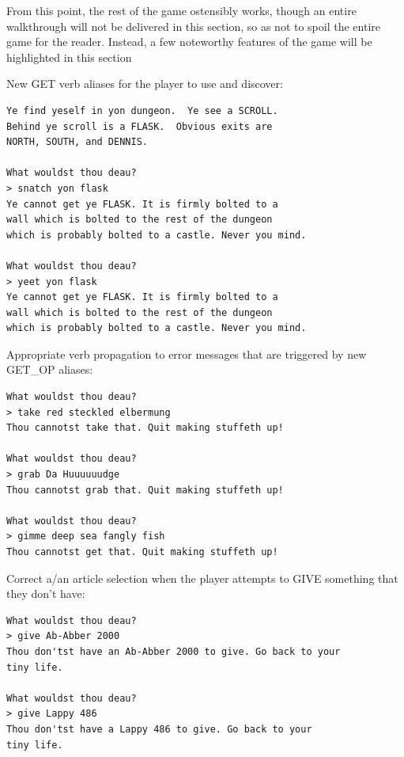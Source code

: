 \documentclass[man,12pt]{apa6}
\begin{document}
From this point, the rest of the game ostensibly works, though an entire
walkthrough will not be delivered in this section, so as not to spoil the entire
game for the reader.  Instead, a few noteworthy features of the game will be
highlighted in this section

New \textsf{GET} verb aliases for the player to use and discover:

\begin{singlespace}
\begin{framed}
\begin{verbatim}Ye find yeself in yon dungeon.  Ye see a SCROLL.
Behind ye scroll is a FLASK.  Obvious exits are
NORTH, SOUTH, and DENNIS.

What wouldst thou deau?
> snatch yon flask
Ye cannot get ye FLASK. It is firmly bolted to a
wall which is bolted to the rest of the dungeon
which is probably bolted to a castle. Never you mind.

What wouldst thou deau?
> yeet yon flask
Ye cannot get ye FLASK. It is firmly bolted to a
wall which is bolted to the rest of the dungeon
which is probably bolted to a castle. Never you mind.
\end{verbatim}
\end{framed}
\end{singlespace}

Appropriate verb propagation to error messages that are triggered by new
\textsf{GET\_OP} aliases:

\begin{singlespace}
\begin{framed}
\begin{verbatim}What wouldst thou deau?
> take red steckled elbermung
Thou cannotst take that. Quit making stuffeth up!

What wouldst thou deau?
> grab Da Huuuuuudge
Thou cannotst grab that. Quit making stuffeth up!

What wouldst thou deau?
> gimme deep sea fangly fish
Thou cannotst get that. Quit making stuffeth up!
\end{verbatim}
\end{framed}
\end{singlespace}

Correct \textsf{a/an} article selection when the player attempts to
\textsf{GIVE} something that they don't have:

\begin{singlespace}
\begin{framed}
\begin{verbatim}What wouldst thou deau?
> give Ab-Abber 2000
Thou don'tst have an Ab-Abber 2000 to give. Go back to your
tiny life.

What wouldst thou deau?
> give Lappy 486 
Thou don'tst have a Lappy 486 to give. Go back to your
tiny life.
\end{verbatim}
\end{framed}
\end{singlespace}
\end{document}
